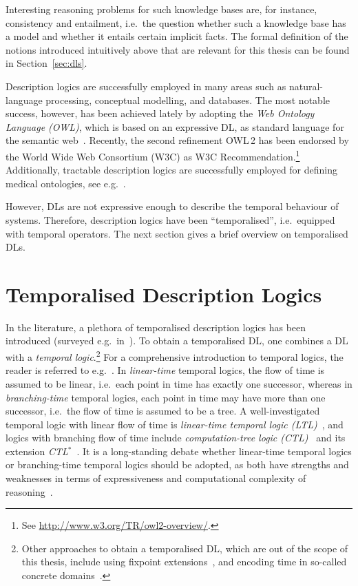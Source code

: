 Interesting reasoning problems for such knowledge bases are, for instance,
consistency and entailment, i.e.~the question whether such a knowledge base has
a model and whether it entails certain implicit facts.
%
The formal definition of the notions introduced intuitively above that are
relevant for this thesis can be found in Section~\ref{sec:dls}.

Description logics are successfully employed in many areas such as
natural-language processing, conceptual modelling, and databases.  The most
notable success, however, has been achieved lately by adopting the \emph{Web
Ontology Language (OWL)}, which is based on an expressive DL, as standard
language for the semantic web~\cite{HoPH-JWS03}.  Recently, the second
refinement OWL\,2 has been endorsed by the World Wide Web Consortium (W3C) as
W3C Recommendation.\footnote{%
    See \url{http://www.w3.org/TR/owl2-overview/}.}
%
Additionally, tractable description logics are successfully employed for
defining medical ontologies, see e.g.~\cite{SBS+-AIME07}.

However, DLs are not expressive enough to describe the temporal behaviour of
systems.  Therefore, description logics have been \enquote{temporalised},
i.e.~equipped with temporal operators.  The next section gives a brief overview
on temporalised DLs.


\section{Temporalised Description Logics}\label{sec:temporalised-dls}

In the literature, a plethora of temporalised description logics has been
introduced (surveyed e.g.\ in~\cite{ArFr-AMAI00,ArFr-05,LuWZ-TIME08}).
%
To obtain a temporalised DL, one combines a DL with a \emph{temporal
logic}.\footnote{%
    Other approaches to obtain a temporalised DL, which are out of the scope of
    this thesis, include using fixpoint
    extensions~\cite{FrTo-DL03,FrTo-IJCAI11}, and encoding time in so-called
    concrete domains~\cite{Lut-IJCAI01}.}
%
For a comprehensive introduction to temporal logics, the reader is referred to
e.g.~\cite{Eme-90,GaHR-94,BaKa-08}.
%
In \emph{linear-time} temporal logics, the flow of time is assumed to be linear,
i.e.~each point in time has exactly one successor, whereas in
\emph{branching-time} temporal logics, each point in time may have more than one
successor, i.e.~the flow of time is assumed to be a tree.  A well-investigated
temporal logic with linear flow of time is \emph{linear-time temporal logic
(LTL)}~\cite{Pnu-FOCS77}, and logics with branching flow of time include
\emph{computation-tree logic (CTL)}~\cite{ClEm-LP81} and its extension
\emph{CTL$^*$}~\cite{EmHa-JACM86}.
%
It is a long-standing debate whether linear-time temporal logics or
branching-time temporal logics should be adopted, as both have strengths and
weaknesses in terms of expressiveness and computational complexity of
reasoning~\cite{Var-TACAS01,NaVa-ATVA07}.


